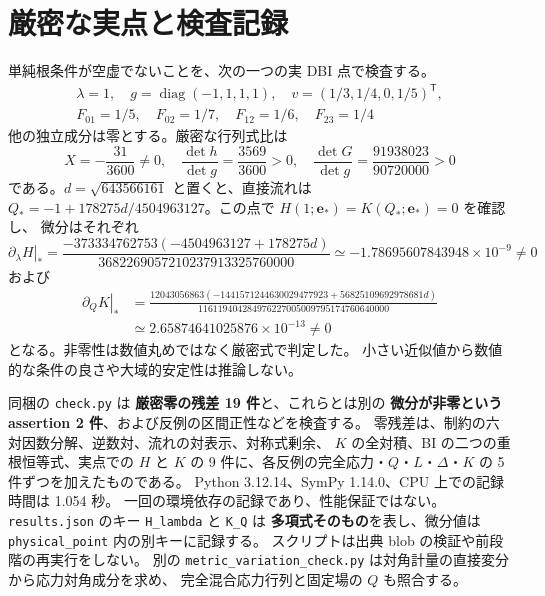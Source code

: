 \documentclass[11pt,a4paper]{article}
\newcommand{\ee}{\boldsymbol e}
\begin{document}
\newpage
\section{厳密な実点と検査記録}
単純根条件が空虚でないことを、次の一つの実 DBI 点で検査する。
\begin{equation}\label{eq:point}
\begin{gathered}
\lambda=1,\quad g=\operatorname{diag}(-1,1,1,1),\quad
v=(1/3,1/4,0,1/5)^{\mathsf T},\\
F_{01}=1/5,\quad F_{02}=1/7,\quad F_{12}=1/6,\quad F_{23}=1/4
\end{gathered}
\end{equation}
他の独立成分は零とする。厳密な行列式比は
\begin{equation}\label{eq:point-branch}
X=-\frac{31}{3600}\ne0,\quad
\frac{\det h}{\det g}=\frac{3569}{3600}>0,\quad
\frac{\det G}{\det g}=\frac{91938023}{90720000}>0
\end{equation}
である。$d=\sqrt{643566161}$ と置くと、直接流れは
$Q_*=-1+178275d/4504963127$。この点で $H(1;\ee_*)=K(Q_*;\ee_*)=0$ を確認し、
微分はそれぞれ
\begin{equation}\label{eq:Hp}
\left.\partial_\lambda H\right|_*
=\frac{-373334762753(-4504963127+178275d)}
 {3682269057210237913325760000}
\simeq-1.78695607843948\times10^{-9}\ne0
\end{equation}
および
\begin{equation}\label{eq:Kp}
\begin{split}
\left.\partial_QK\right|_*
&=\frac{12043056863(-1441571244630029477923+56825109692978681d)}
 {116119404284976227005009795174760640000}\\
&\simeq2.65874641025876\times10^{-13}\ne0
\end{split}
\end{equation}
となる。非零性は数値丸めではなく厳密式で判定した。
小さい近似値から数値的な条件の良さや大域的安定性は推論しない。

同梱の \texttt{check.py} は \textbf{厳密零の残差 19 件}と、これらとは別の
\textbf{微分が非零という assertion 2 件}、および反例の区間正性などを検査する。
零残差は、制約の六対因数分解、逆数対、流れの対表示、対称式剰余、
$K$ の全対積、BI の二つの重根恒等式、実点での $H$ と $K$ の 9 件に、各反例の完全応力・$Q$・$L$・$\Delta$・$K$ の 5 件ずつを加えたものである。
Python 3.12.14、SymPy 1.14.0、CPU 上での記録時間は 1.054 秒。
一回の環境依存の記録であり、性能保証ではない。
\texttt{results.json} のキー \texttt{H\_lambda} と \texttt{K\_Q} は
\textbf{多項式そのもの}を表し、微分値は \texttt{physical\_point} 内の別キーに記録する。
スクリプトは出典 blob の検証や前段階の再実行をしない。
別の \texttt{metric\_variation\_check.py} は対角計量の直接変分から応力対角成分を求め、
完全混合応力行列と固定場の $Q$ も照合する。
\end{document}
